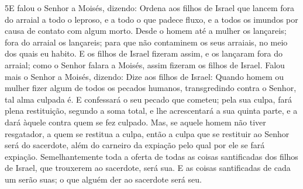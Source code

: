 \lettrine{5} E falou o Senhor a Moisés, dizendo: Ordena
aos filhos de Israel que lancem fora do arraial a todo o leproso, e
a todo o que padece fluxo, e a todos os imundos por causa de contato
com algum morto. Desde o homem até a mulher os lançareis; fora
do arraial os lançareis; para que não contaminem os seus arraiais,
no meio dos quais eu habito. E os filhos de Israel fizeram
assim, e os lançaram fora do arraial; como o Senhor falara a Moisés,
assim fizeram os filhos de Israel. Falou mais o Senhor a Moisés,
dizendo: Dize aos filhos de Israel: Quando homem ou mulher fizer
algum de todos os pecados humanos, transgredindo contra o Senhor,
tal alma culpada é. E confessará o seu pecado que cometeu; pela
sua culpa, fará plena restituição, segundo a soma total, e lhe
acrescentará a sua quinta parte, e a dará àquele contra quem se fez
culpado. Mas, se aquele homem não tiver resgatador, a quem se
restitua a culpa, então a culpa que se restituir ao Senhor será do
sacerdote, além do carneiro da expiação pelo qual por ele se fará
expiação. Semelhantemente toda a oferta de todas as coisas
santificadas dos filhos de Israel, que trouxerem ao sacerdote, será
sua. E as coisas santificadas de cada um serão suas; o que
alguém der ao sacerdote será seu.

